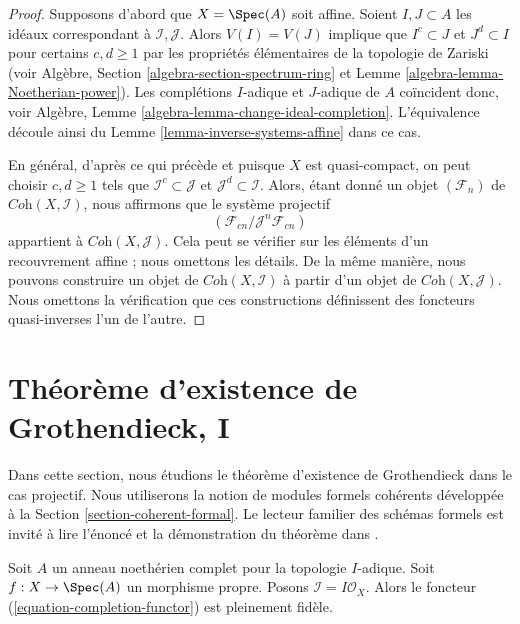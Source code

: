 \begin{proof}
Supposons d'abord que $X = \Spec(A)$ soit affine. Soient $I, J \subset A$ les idéaux
correspondant à $\mathcal{I}, \mathcal{J}$. Alors $V(I) = V(J)$
implique que $I^c \subset J$ et $J^d \subset I$ pour certains $c, d \geq 1$
par les propriétés élémentaires de la topologie de Zariski
(voir Algèbre, Section \ref{algebra-section-spectrum-ring} et
Lemme \ref{algebra-lemma-Noetherian-power}).
Les complétions $I$-adique et $J$-adique de $A$ coïncident donc, voir
Algèbre, Lemme \ref{algebra-lemma-change-ideal-completion}.
L'équivalence découle ainsi du Lemme \ref{lemma-inverse-systems-affine}
dans ce cas.

\medskip\noindent
En général, d'après ce qui précède et puisque
$X$ est quasi-compact, on peut choisir $c, d \geq 1$ tels que
$\mathcal{I}^c \subset \mathcal{J}$ et $\mathcal{J}^d \subset \mathcal{I}$.
Alors, étant donné un objet $(\mathcal{F}_n)$ de
$\textit{Coh}(X, \mathcal{I})$, nous affirmons que le
système projectif
$$
(\mathcal{F}_{cn}/\mathcal{J}^n\mathcal{F}_{cn})
$$
appartient à $\textit{Coh}(X, \mathcal{J})$. Cela peut se vérifier sur
les éléments d'un recouvrement affine ; nous omettons les détails.
De la même manière, nous pouvons construire un objet de
$\textit{Coh}(X, \mathcal{I})$ à partir d'un objet de
$\textit{Coh}(X, \mathcal{J})$. Nous omettons la vérification
que ces constructions définissent des foncteurs quasi-inverses l'un de l'autre.
\end{proof}





\section{Théorème d'existence de Grothendieck, I}
\label{section-existence}

\noindent
Dans cette section, nous étudions le théorème d'existence de Grothendieck dans
le cas projectif. Nous utiliserons la notion de modules formels cohérents
développée à la Section \ref{section-coherent-formal}. Le lecteur familier
des schémas formels est invité à lire l'énoncé et la démonstration
du théorème dans \cite{EGA}.

\begin{lemma}
\label{lemma-fully-faithful}
Soit $A$ un anneau noethérien complet pour la topologie $I$-adique.
Soit $f : X \to \Spec(A)$ un morphisme propre. Posons
$\mathcal{I} = I\mathcal{O}_X$.
Alors le foncteur (\ref{equation-completion-functor}) est pleinement fidèle.
\end{lemma}

